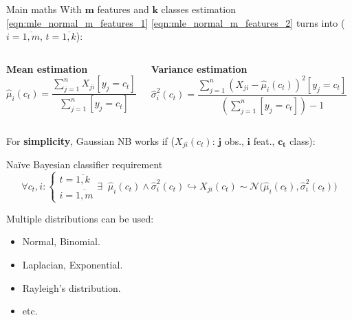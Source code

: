 \documentclass[11pt, aspectratio=169]{beamer}
\newcommand{\emphtext}[1]{\color{black} \textbf{#1}}
\newcommand{\emphmath}[1]{\mathcal{#1}}
\begin{document}
\begin{frame}[allowframebreaks]{Main maths}
    	\noindent With $\bm{m}$ features and $\bm{k}$ classes estimation \eqref{eqn:mle_normal_m_features_1} \eqref{eqn:mle_normal_m_features_2} turns into ($i = \overline{1, m}$, $t = \overline{1, k}$):
    	\begin{columns}[t]
    		\begin{block}{\textbf{Mean estimation}}
    			\vspace*{-0.7\baselineskip}
    			\begin{equation}
    				\label{eqn:mle_normal_m_features_k_classes_1}
    				\hat{\mu}_i\left(c_t\right) = \frac{\sum_{j = 1}^n X_{ji} \left[y_{j} = c_t\right]}{\sum_{j = 1}^n \left[y_{j} = c_t\right]}
    			\end{equation}
    		\end{block}
    		\begin{block}{\textbf{Variance estimation}}
    			\vspace*{-0.7\baselineskip}
    			\begin{equation}
    				\label{eqn:mle_normal_m_features_k_classes_2}
    				\hat{\sigma}_i^2\left(c_t\right)  = \frac{\sum_{j = 1}^n \left(X_{ji} - \hat{\mu}_i\left(c_t\right)\right)^2 \left[y_{j} = c_t\right]}{\left(\sum_{j = 1}^n \left[y_{j} = c_t\right]\right) - 1}
    			\end{equation}
    		\end{block}
    	\end{columns}
    	\framebreak
    	
    	\noindent For \emphtext{simplicity}, Gaussian NB works if ($X_{ji}\left(c_t\right)$: $\bm{j}$ obs., $\bm{i}$ feat., $\bm{c_t}$ class):
    	\begin{block}{Na\"{i}ve Bayesian classifier requirement}
    		\begin{equation}
    			\forall c_t, i: 
    			\left\{\begin{array}{l}
    				t = \overline{1, k}\\
    				i = \overline{1, m}
    			\end{array}\right. \exists \;\;
    			\hat{\mu}_i\left(c_t\right) \wedge \hat{\sigma}^2_{i}\left(c_t\right) \hookrightarrow X_{ji}\left(c_t\right) \sim \emphmath{N}\Big(\hat{\mu}_i\left(c_t\right), \hat{\sigma}^2_{i}\left(c_t\right) \Big)
    		\end{equation}
    	\end{block}
    	\framebreak
    	
    	\noindent Multiple distributions can be used:\\[10pt]
    	\begin{itemize}
    		\item Normal, Binomial.\\[10pt]
    		\item Laplacian, Exponential.\\[10pt]
    		\item Rayleigh's distribution.\\[10pt]
    		\item etc.
    	\end{itemize}
    \end{frame}
    
\end{document}
